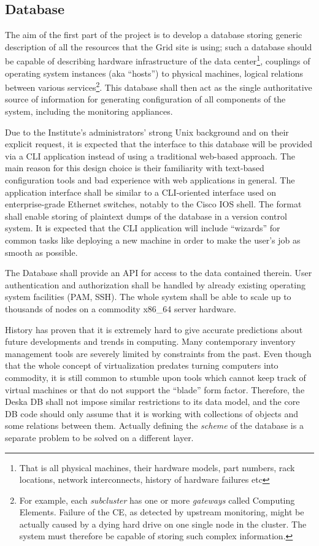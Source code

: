 \documentclass{article}
\begin{document}
\subsection{Database}

The aim of the first part of the project is to develop a database storing generic description of all the resources that the Grid
site is using; such a database should be capable of describing hardware infrastructure of the data center\footnote{That is all
physical machines, their hardware models, part numbers, rack locations, network interconnects, history of hardware failures etc},
couplings of operating system instances (aka ``hosts'') to physical machines, logical relations between various
services\footnote{For example, each {\em subcluster} has one or more {\em gateways} called Computing Elements.  Failure of the CE,
as detected by upstream monitoring, might be actually caused by a dying hard drive on one single node in the cluster.  The system
must therefore be capable of storing such complex information.}.  This database shall then act as the single authoritative source
of information for generating configuration of all components of the system, including the monitoring appliances.

Due to the Institute's administrators' strong Unix background and on their explicit request, it is expected that the interface to
this database will be provided via a CLI application instead of using a traditional web-based approach.  The main reason for this
design choice is their familiarity with text-based configuration tools and bad experience with web applications in general.  The
application interface shall be similar to a CLI-oriented interface used on enterprise-grade Ethernet switches, notably to the
Cisco IOS shell.  The format shall enable storing of plaintext dumps of the database in a version control system.  It is expected
that the CLI application will include ``wizards'' for common tasks like deploying a new machine in order to make the user's job as
smooth as possible.

The Database shall provide an API for access to the data contained therein.  User authentication and authorization shall be
handled by already existing operating system facilities (PAM, SSH).  The whole system shall be able to scale up to thousands of
nodes on a commodity x86\_64 server hardware.

History has proven that it is extremely hard to give accurate predictions about future developments and trends in computing.  Many
contemporary inventory management tools are severely limited by constraints from the past.  Even though that the whole concept of
virtualization predates turning computers into commodity, it is still common to stumble upon tools which cannot keep track of
virtual machines or that do not support the ``blade'' form factor.  Therefore, the Deska DB shall not impose similar restrictions
to its data model, and the core DB code should only assume that it is working with collections of objects and some relations
between them.  Actually defining the {\em scheme} of the database is a separate problem to be solved on a different layer.
\end{document}
